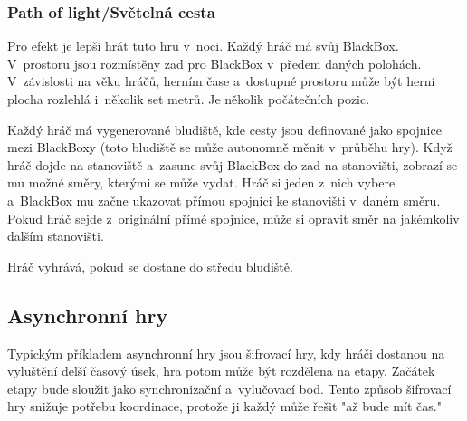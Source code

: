 \subsubsection{Path of light/Světelná cesta}

Pro efekt je lepší hrát tuto hru v~noci.
Každý hráč má svůj BlackBox.
V~prostoru jsou rozmístěny zad pro BlackBox v~předem daných polohách.
V~závislosti na věku hráčů, herním čase a~dostupné prostoru může být herní plocha rozlehlá i~několik set metrů.
Je několik počátečních pozic.

Každý hráč má vygenerované bludiště, kde cesty jsou definované jako spojnice mezi BlackBoxy (toto bludiště se může autonomně měnit v~průběhu hry).
Když hráč dojde na stanoviště a~zasune svůj BlackBox do zad na stanovišti, zobrazí se mu možné směry, kterými se může vydat.
Hráč si jeden z~nich vybere a~BlackBox mu začne ukazovat přímou spojnici ke stanovišti v~daném směru.
Pokud hráč sejde z~originální přímé spojnice, může si opravit směr na jakémkoliv dalším stanovišti.

Hráč vyhrává, pokud se dostane do středu bludiště.


\subsection{Asynchronní hry}

Typickým příkladem asynchronní hry jsou šifrovací hry, kdy hráči dostanou na vyluštění delší časový úsek, hra potom může být rozdělena na etapy.
Začátek etapy bude sloužit jako synchronizační a~vylučovací bod.
Tento způsob šifrovací hry snižuje potřebu koordinace, protože ji každý může řešit "až bude mít čas."
